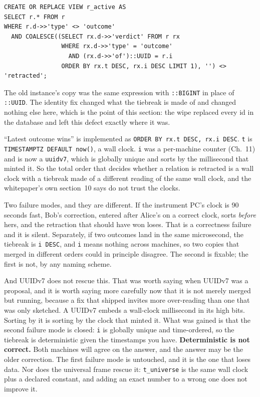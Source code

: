 \begin{verbatim}
CREATE OR REPLACE VIEW r_active AS
SELECT r.* FROM r
WHERE r.d->>'type' <> 'outcome'
  AND COALESCE((SELECT rx.d->>'verdict' FROM r rx
                WHERE rx.d->>'type' = 'outcome'
                  AND (rx.d->>'of')::UUID = r.i
                ORDER BY rx.t DESC, rx.i DESC LIMIT 1), '') <> 'retracted';
\end{verbatim}

The old instance's copy was the same expression with \texttt{::BIGINT} in place of \texttt{::UUID}. The identity fix changed what the tiebreak is made of and changed nothing else here, which is the point of this section: the wipe replaced every id in the database and left this defect exactly where it was.

``Latest outcome wins'' is implemented as \texttt{ORDER BY rx.t DESC, rx.i DESC}. \texttt{t} is \texttt{TIMESTAMPTZ DEFAULT now()}, a wall clock. \texttt{i} was a per-machine counter (Ch.~11) and is now a \texttt{uuidv7}, which is globally unique and sorts by the millisecond that minted it. So the total order that decides whether a relation is retracted is a wall clock with a tiebreak made of a different reading of the same wall clock, and the whitepaper's own section~10 says do not trust the clocks.

Two failure modes, and they are different. If the instrument PC's clock is 90 seconds fast, Bob's correction, entered after Alice's on a correct clock, sorts \emph{before} hers, and the retraction that should have won loses. That is a correctness failure and it is silent. Separately, if two outcomes land in the same microsecond, the tiebreak is \texttt{i DESC}, and \texttt{i} means nothing across machines, so two copies that merged in different orders could in principle disagree. The second is fixable; the first is not, by any naming scheme.

And UUIDv7 does not rescue this. That was worth saying when UUIDv7 was a proposal, and it is worth saying more carefully now that it is not merely merged but running, because a fix that shipped invites more over-reading than one that was only sketched. A UUIDv7 embeds a wall-clock millisecond in its high bits. Sorting by it is sorting by the clock that minted it. What was gained is that the second failure mode is closed: \texttt{i} is globally unique and time-ordered, so the tiebreak is deterministic given the timestamps you have. \textbf{Deterministic is not correct.} Both machines will agree on the answer, and the answer may be the older correction. The first failure mode is untouched, and it is the one that loses data. Nor does the universal frame rescue it: \texttt{t\_universe} is the same wall clock plus a declared constant, and adding an exact number to a wrong one does not improve it.

